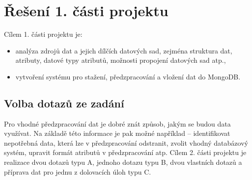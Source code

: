 \documentclass[12pt]{article}
\begin{document}
\afterpage{\cfoot{\thepage }}

\section{Řešení 1. části projektu}
Cílem 1. části projektu je:
\begin{itemize}
    \item analýza zdrojů dat a jejich dílčích datových sad, zejména struktura dat, atributy, datové typy atributů, možnosti propojení datových sad atp.,
    \item vytvoření systému pro stažení, předzpracování a vložení dat do MongoDB.
\end{itemize}

\subsection{Volba dotazů ze zadání}
\label{dotazy}
Pro vhodné předzpracování dat je dobré znát způsob, jakým se budou data využívat. Na základě této informace je pak možné například -- identifikovat nepotřebná data, která lze v předzpracování odstranit, zvolit vhodný databázový systém, upravit formát atributů v předzpracování atp. Cílem 2. části projektu je realizace dvou dotazů typu A, jednoho dotazu typu B, dvou vlastních dotazů a příprava dat pro jednu z dolovacích úloh typu C.
\end{document}
